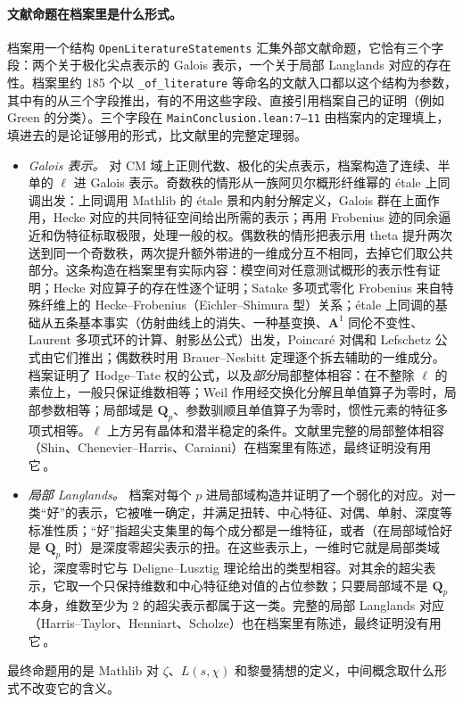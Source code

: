 \documentclass[11pt]{article}
\newcommand{\Lean}[1]{\texttt{\small #1}}
\newcommand{\Q}{\mathbf{Q}}
\begin{document}
\paragraph{文献命题在档案里是什么形式。} 档案用一个结构 \Lean{OpenLiteratureStatements} 汇集外部文献命题，它恰有三个字段：两个关于极化尖点表示的 Galois 表示，一个关于局部 Langlands 对应的存在性。档案里约 185 个以 \Lean{\_of\_literature} 等命名的文献入口都以这个结构为参数，其中有的从三个字段推出，有的不用这些字段、直接引用档案自己的证明（例如 Green 的分类）。三个字段在 \Lean{MainConclusion.lean:7--11} 由档案内的定理填上，填进去的是论证够用的形式，比文献里的完整定理弱。
\begin{itemize}
\item \emph{Galois 表示。} 对 CM 域上正则代数、极化的尖点表示，档案构造了连续、半单的 $\ell$ 进 Galois 表示。奇数秩的情形从一族阿贝尔概形纤维幂的 étale 上同调出发：上同调用 Mathlib 的 étale 景和内射分解定义，Galois 群在上面作用，Hecke 对应的共同特征空间给出所需的表示；再用 Frobenius 迹的同余逼近和伪特征标取极限，处理一般的权。偶数秩的情形把表示用 theta 提升两次送到同一个奇数秩，两次提升额外带进的一维成分互不相同，去掉它们取公共部分。这条构造在档案里有实际内容：模空间对任意测试概形的表示性有证明；Hecke 对应算子的存在性逐个证明；Satake 多项式零化 Frobenius 来自特殊纤维上的 Hecke–Frobenius（Eichler–Shimura 型）关系；étale 上同调的基础从五条基本事实（仿射曲线上的消失、一种基变换、$\mathbf A^1$ 同伦不变性、Laurent 多项式环的计算、射影丛公式）出发，Poincaré 对偶和 Lefschetz 公式由它们推出；偶数秩时用 Brauer–Nesbitt 定理逐个拆去辅助的一维成分。档案证明了 Hodge–Tate 权的公式，以及\emph{部分}局部整体相容：在不整除 $\ell$ 的素位上，一般只保证维数相等；Weil 作用经交换化分解且单值算子为零时，局部参数相等；局部域是 $\Q_p$、参数驯顺且单值算子为零时，惯性元素的特征多项式相等。$\ell$ 上方另有晶体和潜半稳定的条件。文献里完整的局部整体相容（Shin、Chenevier–Harris、Caraiani）在档案里有陈述，最终证明没有用它\,\cite{shin,ch,caraiani}。
\item \emph{局部 Langlands。} 档案对每个 $p$ 进局部域构造并证明了一个弱化的对应。对一类“好”的表示，它被唯一确定，并满足扭转、中心特征、对偶、单射、深度等标准性质；“好”指超尖支集里的每个成分都是一维特征，或者（在局部域恰好是 $\Q_p$ 时）是深度零超尖表示的扭。在这些表示上，一维时它就是局部类域论，深度零时它与 Deligne–Lusztig 理论给出的类型相容。对其余的超尖表示，它取一个只保持维数和中心特征绝对值的占位参数；只要局部域不是 $\Q_p$ 本身，维数至少为 $2$ 的超尖表示都属于这一类。完整的局部 Langlands 对应（Harris–Taylor、Henniart、Scholze）也在档案里有陈述，最终证明没有用它\,\cite{ht,henniart,scholze}。
\end{itemize}
最终命题用的是 Mathlib 对 $\zeta$、$L(s,\chi)$ 和黎曼猜想的定义，中间概念取什么形式不改变它的含义。
\end{document}
